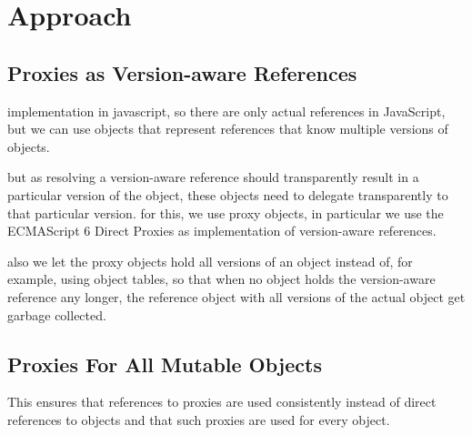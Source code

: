 % 
% 

\section{Approach}

\subsection{Proxies as Version-aware References}

implementation in javascript, so there are only actual references in JavaScript, but we can use objects that represent references that know multiple versions of objects.

but as resolving a version-aware reference should transparently result in a particular version of the object, these objects need to delegate transparently to that particular version.
for this, we use proxy objects, in particular we use the ECMAScript 6 Direct Proxies as implementation of version-aware references.

also we let the proxy objects hold all versions of an object instead of, for example, using object tables, so that when no object holds the version-aware reference any longer, the reference object with all versions of the actual object get garbage collected.



\subsection{Proxies For All Mutable Objects}

This ensures that references to proxies are used consistently instead of direct references to objects and that such proxies are used for every object.



